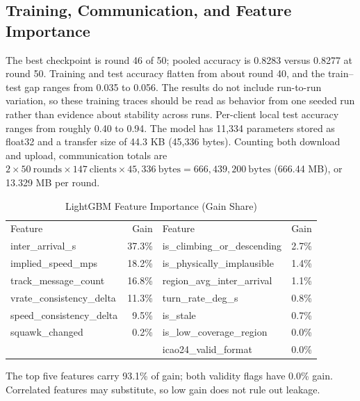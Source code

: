 \documentclass[conference]{IEEEtran}
\begin{document}
\subsection{Training, Communication, and Feature Importance}
The best checkpoint is round 46 of 50; pooled accuracy is 0.8283 versus 0.8277 at round 50. Training and test accuracy flatten from about round 40, and the train--test gap ranges from 0.035 to 0.056. The results do not include run-to-run variation, so these training traces should be read as behavior from one seeded run rather than evidence about stability across runs. Per-client local test accuracy ranges from roughly 0.40 to 0.94. The model has 11,334 parameters stored as float32 and a transfer size of 44.3 KB (45,336 bytes). Counting both download and upload, communication totals are $2\times50~\mathrm{rounds}\times147~\mathrm{clients}\times45{,}336~\mathrm{bytes}=666{,}439{,}200~\mathrm{bytes}$ (666.44 MB), or 13.329 MB per round.
\begin{table}[!t]\caption{LightGBM Feature Importance (Gain Share)}\label{tab:importance}\centering\footnotesize
\setlength{\tabcolsep}{4pt}\begin{tabular}{lr|lr}\toprule Feature & Gain & Feature & Gain \\
inter\_arrival\_s & 37.3\% & is\_climbing\_or\_descending & 2.7\% \\
implied\_speed\_mps & 18.2\% & is\_physically\_implausible & 1.4\% \\
track\_message\_count & 16.8\% & region\_avg\_inter\_arrival & 1.1\% \\
vrate\_consistency\_delta & 11.3\% & turn\_rate\_deg\_s & 0.8\% \\
speed\_consistency\_delta & 9.5\% & is\_stale & 0.7\% \\
squawk\_changed & 0.2\% & is\_low\_coverage\_region & 0.0\% \\
 & & icao24\_valid\_format & 0.0\% \\
\bottomrule\end{tabular}\end{table}
The top five features carry 93.1\% of gain; both validity flags have 0.0\% gain. Correlated features may substitute, so low gain does not rule out leakage.
\end{document}
